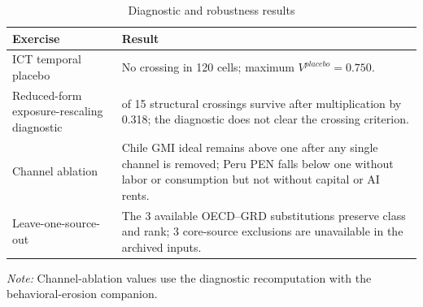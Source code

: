 \begin{table}[H]
\centering
\footnotesize
\begin{singlespace}
\caption{Diagnostic and robustness results}
\label{tab:diagnostics_clean}
\begin{tabular}{@{}>{\raggedright\arraybackslash}p{}>{\raggedright\arraybackslash}p{}@{}}
\toprule
Exercise & Result \\
\midrule
ICT temporal placebo & No crossing in 120 cells; maximum $V^{placebo}=0.750$. \\
Reduced-form exposure-rescaling diagnostic & 6 of 15 structural crossings survive after multiplication by 0.318; the diagnostic does not clear the crossing criterion. \\
Channel ablation & Chile GMI ideal remains above one after any single channel is removed; Peru PEN falls below one without labor or consumption but not without capital or AI rents. \\
Leave-one-source-out & The 3 available OECD--GRD substitutions preserve class and rank; 3 core-source exclusions are unavailable in the archived inputs. \\
\bottomrule
\end{tabular}
\begin{minipage}{0.94\textwidth}\footnotesize
\emph{Note:} Channel-ablation values use the diagnostic recomputation with the behavioral-erosion companion.
\end{minipage}
\end{singlespace}
\end{table}
